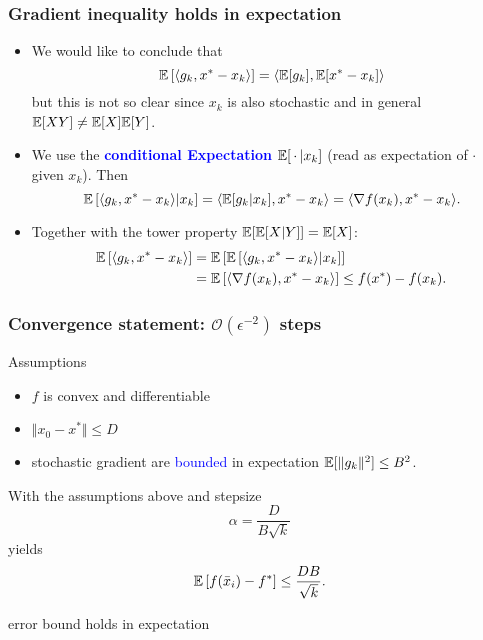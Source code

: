 \documentclass{beamer}
\begin{document}
\begin{frame}
  \frametitle{Gradient inequality holds in expectation}

  \begin{itemize}
    \item We would like to conclude that
          \begin{equation}
            \mathbb{E} \left[ \langle g_k, x^*-x_k \rangle\right] = \langle \mathbb{E}[g_k], \mathbb{E}[x^*-x_k] \rangle
          \end{equation}
          but this is not so clear since $x_k$ is also stochastic and in general $\mathbb{E}[XY]\neq \mathbb{E}[X]\mathbb{E}[Y]$.

    \item We use the \textcolor{blue}{\textbf{conditional Expectation}} $\mathbb{E}[\, \cdot \, | x_k]$ (read as expectation of $\cdot$ given $x_k$). Then
          \begin{equation}
            \mathbb{E} \left[ \langle g_k, x^*-x_k \rangle | x_k \right] = \langle \mathbb{E}[g_k | x_k], x^*-x_k \rangle = \langle \nabla f(x_k), x^*-x_k \rangle.
          \end{equation}
    \item Together with the tower property $\mathbb{E}[\mathbb{E}[X|Y]]= \mathbb{E}[X]$:
          \begin{align}
            \mathbb{E} \left[ \langle g_k, x^*-x_k \rangle \right] &= \mathbb{E}\left[\mathbb{E} \left[ \langle g_k, x^*-x_k \rangle | x_k \right] \right] \\
                                               &= \mathbb{E}\left[\langle \nabla f(x_k), x^*-x_k \rangle \right] \le f(x^*) - f(x_k).
          \end{align}

  \end{itemize}

\end{frame}


\begin{frame}
  \frametitle{Convergence statement: $\mathcal{O}(\epsilon^{-2})$ steps}
  \begin{block}{Assumptions}
    \begin{itemize}
      \item $f$ is convex and differentiable
      \item $\Vert x_0-x^* \Vert \le D$
      \item stochastic gradient are \textcolor{blue}{bounded} in expectation $\mathbb{E}[\Vert g_k \Vert^2] \le B^2$.
    \end{itemize}
  \end{block}
  \begin{theorem}
    With the assumptions above and stepsize
    \begin{equation}
      \alpha = \frac{D}{B \sqrt{k}}
    \end{equation}
    yields
    \begin{equation}
      \mathbb{E} \left[ f(\bar{x}_i) - f^*\right] \le \frac{DB}{\sqrt{k}}.
    \end{equation}
  \end{theorem}
  error bound holds in expectation

\end{frame}
\end{document}
